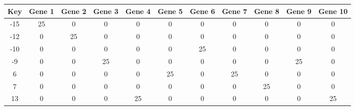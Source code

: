 \begin{tabular}{|c|c|c|c|c|c|c|c|c|c|c|}
\hline
Key & Gene 1 & Gene 2 & Gene 3 & Gene 4 & Gene 5 & Gene 6 & Gene 7 & Gene 8 & Gene 9 & Gene 10 \\
\hline
-15 & 25 & 0 & 0 & 0 & 0 & 0 & 0 & 0 & 0 & 0 \\
-12 & 0 & 25 & 0 & 0 & 0 & 0 & 0 & 0 & 0 & 0 \\
-10 & 0 & 0 & 0 & 0 & 0 & 25 & 0 & 0 & 0 & 0 \\
-9 & 0 & 0 & 25 & 0 & 0 & 0 & 0 & 0 & 25 & 0 \\
6 & 0 & 0 & 0 & 0 & 25 & 0 & 25 & 0 & 0 & 0 \\
7 & 0 & 0 & 0 & 0 & 0 & 0 & 0 & 25 & 0 & 0 \\
13 & 0 & 0 & 0 & 25 & 0 & 0 & 0 & 0 & 0 & 25 \\
\hline
\end{tabular}